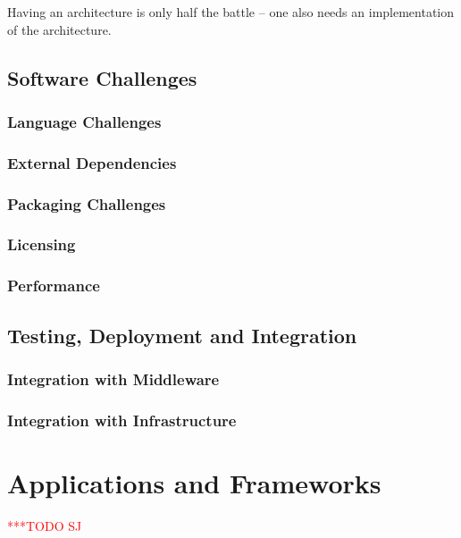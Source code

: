 \documentclass[a4paper,12pt]{article}
\newcommand{\todo}[1]{     {\textcolor{red}  { ***TODO      #1 }}}
\newcommand{\todo}[1]{}
\begin{document}
Having an architecture is only half the battle -- one also needs an
implementation of the architecture.


\subsection{Software Challenges}

\subsubsection{Language Challenges}

\subsubsection{External Dependencies}

\subsubsection{Packaging Challenges}

\subsubsection{Licensing}

\subsubsection{Performance}



\subsection{Testing, Deployment and Integration} 



\subsubsection{Integration with Middleware}
\subsubsection{Integration with Infrastructure}



% 
\section{Applications and Frameworks}\todo{SJ}
\label{apps_and_frameworks}
\end{document}
